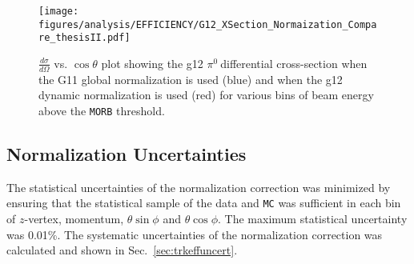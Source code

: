 \documentclass[11pt,a4paper]{article}
\newcommand{\abbr}[1]{\textsc{\texttt{#1}}}
\def\pizT{$\pi^{0} \ $}
\def\figures{/Users/michaelkunkel/WORK/GIT_HUB/THESIS/figures/print}
\newlength{\figwidth}
\newlength{\hfigheight}
\begin{document}
													\begin{figure}[h!]\begin{center}
															\texttt{[image: \\figures/analysis/EFFICIENCY/G12\_XSection\_Normaization\_Compare\_thesisII.pdf]}
															\caption[$\frac{d \sigma}{d \Omega}$ vs. $\cos \theta$ plot showing the g12 \pizT differential cross-section when the G11 global normalization is used (blue) and when the g12 dynamic normalization is used (red) for various bins of beam energy above \abbr{MORB} threshold]{\label{fig:toteff_compareII} $\frac{d \sigma}{d \Omega}$ vs. $\cos \theta$ plot showing the g12 \pizT differential cross-section when the G11 global normalization is used (blue) and when the g12 dynamic normalization is used (red) for various bins of beam energy above the \abbr{MORB} threshold.}
														\end{center}\end{figure}
														
														\FloatBarrier
														
	\subsection{Normalization Uncertainties}
		The statistical uncertainties of the normalization correction was minimized by ensuring that the statistical sample of the data and \abbr{MC} was sufficient in each bin of $z$-vertex, momentum, $\theta \sin\phi$ and $\theta \cos\phi$. The maximum statistical uncertainty was 0.01\%. The systematic uncertainties of the normalization correction was calculated and shown in Sec.~\ref{sec:trkeffuncert}.
\end{document}
